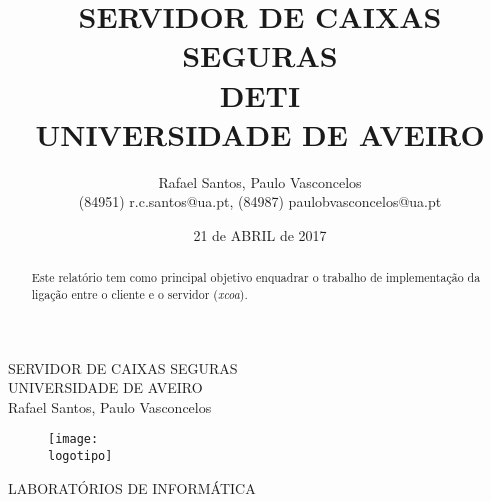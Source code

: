 \documentclass{report}
\begin{document}
%
\def\titulo{SERVIDOR DE CAIXAS SEGURAS}
\def\subtitulo{CLIENTE, TESTES & DOCUMENTOS}
\def\data{21 de ABRIL de 2017}
\def\autores{Rafael Santos, Paulo Vasconcelos}
\def\autorescontactos{(84951) r.c.santos@ua.pt, (84987) paulobvasconcelos@ua.pt}
\def\versao{LABORATÓRIOS DE INFORMÁTICA}
\def\departamento{DETI}
\def\empresa{UNIVERSIDADE DE AVEIRO}
\def\logotipo{ua.pdf}
%
%
\begin{titlepage}

\begin{center}
%
\vspace*{50mm}
%
{\Huge \titulo}\\ 
%
\vspace{10mm}
%
{\Large \empresa}\\
%
\vspace{10mm}
%
{\LARGE \autores}\\ 
%
\vspace{30mm}
%
\begin{figure}[h]
\center
\texttt{[image: \\logotipo]}
\end{figure}
%
\vspace{30mm}
\end{center}
%
\begin{flushright}
\versao
\end{flushright}
\end{titlepage}

\title{%
{\Huge\textbf{\titulo}}\\
{\Large \departamento\\ \empresa}
}
%
\author{%
    \autores \\
    \autorescontactos
}
%
\date{\data}
%
\maketitle


\begin{abstract}
Este relatório tem como principal objetivo enquadrar o trabalho de implementação da ligação entre o cliente e o servidor (\textit{xcoa}).

\end{abstract}

\end{document}
